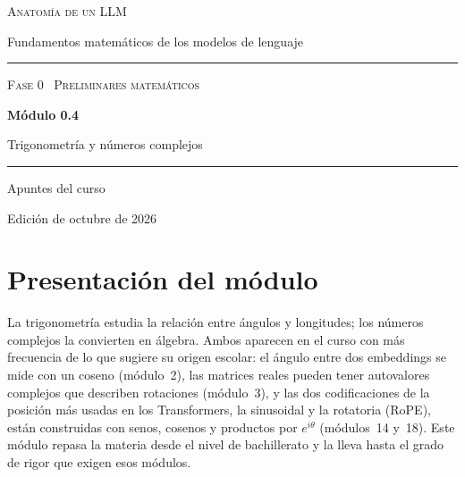 \documentclass[11pt,a4paper,twoside,openany]{book}
\begin{document}
\frontmatter
\begin{titlepage}
\centering
\vspace*{2.5cm}
{\large\scshape Anatomía de un LLM}\par
\vspace{0.4cm}
{\normalsize Fundamentos matemáticos de los modelos de lenguaje}\par
\vspace{2.2cm}
\rule{\textwidth}{0.8pt}\par\vspace{0.5cm}
{\small\scshape Fase 0 \textperiodcentered\ Preliminares matemáticos}\par\vspace{0.3cm}
{\Huge\bfseries Módulo 0.4\par}\vspace{0.3cm}
{\LARGE Trigonometría y números complejos\par}
\vspace{0.5cm}\rule{\textwidth}{0.4pt}\par
\vspace{1.6cm}
{\large Apuntes del curso}\par
\vfill
{\small Edición de octubre de 2026}\par
\end{titlepage}

\chapter*{Presentación del módulo}

La trigonometría estudia la relación entre ángulos y longitudes; los números complejos la convierten en álgebra. Ambos aparecen en el curso con más frecuencia de lo que sugiere su origen escolar: el ángulo entre dos embeddings se mide con un coseno (módulo~2), las matrices reales pueden tener autovalores complejos que describen rotaciones (módulo~3), y las dos codificaciones de la posición más usadas en los Transformers, la sinusoidal y la rotatoria (RoPE), están construidas con senos, cosenos y productos por $e^{i\theta}$ (módulos~14 y~18). Este módulo repasa la materia desde el nivel de bachillerato y la lleva hasta el grado de rigor que exigen esos módulos.
\end{document}
